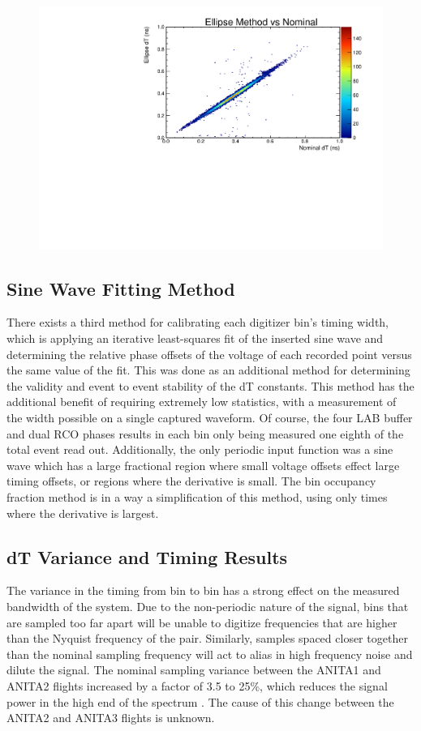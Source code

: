 	\begin{figure}
		\includegraphics[width=\textwidth]{figures/ellipseComparison}
		\caption{}
		\label{fig:ellipseResults}
	\end{figure}


	\subsection{Sine Wave Fitting Method}
	
	There exists a third method for calibrating each digitizer bin's timing width, which is applying an iterative least-squares fit of the inserted sine wave and determining the relative phase offsets of the voltage of each recorded point versus the same value of the fit.  This was done as an additional method for determining the validity and event to event stability of the dT constants.  This method has the additional benefit of requiring extremely low statistics, with a measurement of the width possible on a single captured waveform.  Of course, the four LAB buffer and dual RCO phases results in each bin only being measured one eighth of the total event read out.  Additionally, the only periodic input function was a sine wave which has a large fractional region where small voltage offsets effect large timing offsets, or regions where the derivative is small.  The bin occupancy fraction method is in a way a simplification of this method, using only times where the derivative is largest.  
	
	


	\subsection{dT Variance and Timing Results}	
		The variance in the timing from bin to bin has a strong effect on the measured bandwidth of the system.  Due to the non-periodic nature of the signal, bins that are sampled too far apart will be unable to digitize frequencies that are higher than the Nyquist frequency of the pair.  Similarly, samples spaced closer together than the nominal sampling frequency will act to alias in high frequency noise and dilute the signal.  The nominal sampling variance between the ANITA1 and ANITA2 flights increased by a factor of 3.5 to 25\%, which reduces the signal power in the high end of the spectrum .  The cause of this change between the ANITA2 and ANITA3 flights is unknown.
		
